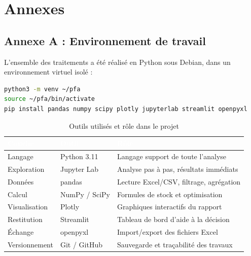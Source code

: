 \documentclass[12pt, a4paper, oneside]{report}
\begin{document}
\chapter*{Annexes}

\section*{Annexe A : Environnement de travail}

L'ensemble des traitements a été réalisé en Python sous Debian, dans un
environnement virtuel isolé :

\begin{lstlisting}[language=bash, caption={Mise en place de l'environnement}]
python3 -m venv ~/pfa
source ~/pfa/bin/activate
pip install pandas numpy scipy plotly jupyterlab streamlit openpyxl
\end{lstlisting}

\begin{table}[H]
  \centering
  \caption{Outils utilisés et rôle dans le projet}
  \label{tab:outils}
  \renewcommand{\arraystretch}{1.3}
  \small
  \begin{tabularx}{\textwidth}{|l|l|X|}
    \hline
    \rowcolor{iacsTableHead}
    \textcolor{white}{\textbf{Couche}} &
    \textcolor{white}{\textbf{Outil}} &
    \textcolor{white}{\textbf{Rôle}} \\
    \hline
    Langage            & Python 3.11    & Langage support de toute l'analyse \\
    \hline
    \rowcolor{iacsLightGray}
    Exploration        & Jupyter Lab    & Analyse pas à pas, résultats immédiats \\
    \hline
    Données            & pandas         & Lecture Excel/CSV, filtrage, agrégation \\
    \hline
    \rowcolor{iacsLightGray}
    Calcul             & NumPy / SciPy  & Formules de stock et optimisation \\
    \hline
    Visualisation      & Plotly         & Graphiques interactifs du rapport \\
    \hline
    \rowcolor{iacsLightGray}
    Restitution        & Streamlit      & Tableau de bord d'aide à la décision \\
    \hline
    Échange            & openpyxl       & Import/export des fichiers Excel \\
    \hline
    \rowcolor{iacsLightGray}
    Versionnement      & Git / GitHub   & Sauvegarde et traçabilité des travaux \\
    \hline
  \end{tabularx}
\end{table}
\end{document}
